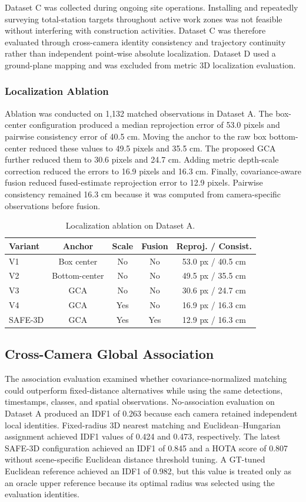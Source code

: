 Dataset C was collected during ongoing site operations. Installing and repeatedly surveying total-station targets throughout active work zones was not feasible without interfering with construction activities. Dataset C was therefore evaluated through cross-camera identity consistency and trajectory continuity rather than independent point-wise absolute localization. Dataset D used a ground-plane mapping and was excluded from metric 3D localization evaluation.

\subsubsection{Localization Ablation}
Ablation was conducted on 1,132 matched observations in Dataset A. The box-center configuration produced a median reprojection error of 53.0 pixels and pairwise consistency error of 40.5 cm. Moving the anchor to the raw box bottom-center reduced these values to 49.5 pixels and 35.5 cm. The proposed GCA further reduced them to 30.6 pixels and 24.7 cm. Adding metric depth-scale correction reduced the errors to 16.9 pixels and 16.3 cm. Finally, covariance-aware fusion reduced fused-estimate reprojection error to 12.9 pixels. Pairwise consistency remained 16.3 cm because it was computed from camera-specific observations before fusion.

\begin{table}[t]
\centering
\caption{Localization ablation on Dataset A.}
\label{tab:ablation}
\begin{tabular}{lcccc}
\toprule
Variant & Anchor & Scale & Fusion & Reproj. / Consist. \\
\midrule
V1 & Box center & No & No & 53.0 px / 40.5 cm \\
V2 & Bottom-center & No & No & 49.5 px / 35.5 cm \\
V3 & GCA & No & No & 30.6 px / 24.7 cm \\
V4 & GCA & Yes & No & 16.9 px / 16.3 cm \\
SAFE-3D & GCA & Yes & Yes & 12.9 px / 16.3 cm \\
\bottomrule
\end{tabular}
\end{table}

\subsection{Cross-Camera Global Association}
The association evaluation examined whether covariance-normalized matching could outperform fixed-distance alternatives while using the same detections, timestamps, classes, and spatial observations. No-association evaluation on Dataset A produced an IDF1 of 0.263 because each camera retained independent local identities. Fixed-radius 3D nearest matching and Euclidean--Hungarian assignment achieved IDF1 values of 0.424 and 0.473, respectively. The latest SAFE-3D configuration achieved an IDF1 of 0.845 and a HOTA score of 0.807 without scene-specific Euclidean distance threshold tuning. A GT-tuned Euclidean reference achieved an IDF1 of 0.982, but this value is treated only as an oracle upper reference because its optimal radius was selected using the evaluation identities.

